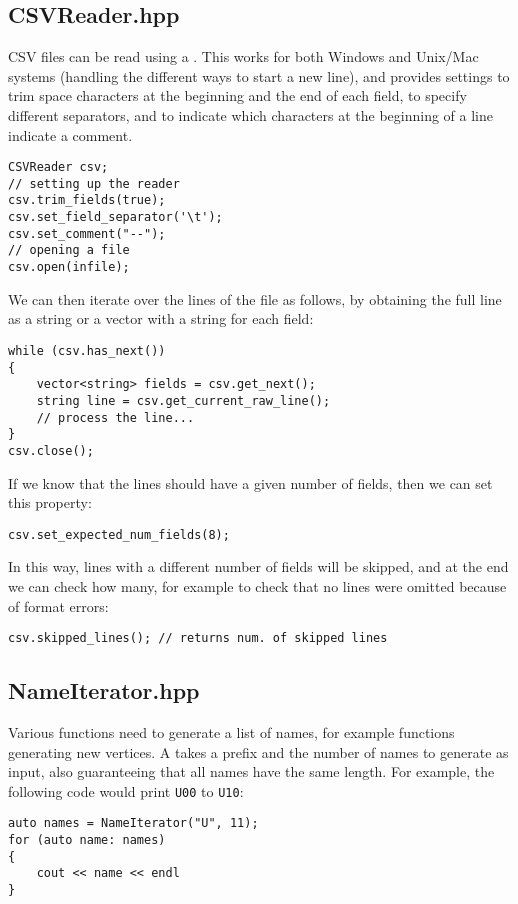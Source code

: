 \subsection{CSVReader.hpp}

CSV files can be read using a . This works
for both Windows and Unix/Mac systems (handling the different ways to start a new line), and provides settings to trim space characters at the beginning and the end of each field, to specify different separators, and to indicate which characters at
the beginning of a line indicate a comment.

\begin{lstlisting}[style=c++]
CSVReader csv;
// setting up the reader
csv.trim_fields(true);
csv.set_field_separator('\t');
csv.set_comment("--");
// opening a file
csv.open(infile);
\end{lstlisting}

We can then iterate over the lines of the file as follows, by obtaining the full line as a string or a vector with a string for each field:
\begin{lstlisting}[style=c++]
while (csv.has_next())
{
    vector<string> fields = csv.get_next();
    string line = csv.get_current_raw_line();
    // process the line...
}
csv.close();
\end{lstlisting}

If we know that the lines should have a given number of fields, then we can set this property:
\begin{lstlisting}[style=c++]
csv.set_expected_num_fields(8);
\end{lstlisting}
In this way, lines with a different number of fields will be skipped, and at the end we can check how many, for example to check that no lines were omitted because of format errors:
\begin{lstlisting}[style=c++]
csv.skipped_lines(); // returns num. of skipped lines
\end{lstlisting}


\subsection{NameIterator.hpp}

Various functions need to generate a list of names, for example functions generating new vertices. A  takes a prefix and the number of names to generate as input, also guaranteeing that all names have the same length. For example, the following code would print \texttt{U00} to \texttt{U10}:
\begin{lstlisting}[style=c++]
auto names = NameIterator("U", 11);
for (auto name: names)
{
    cout << name << endl
}
\end{lstlisting}


